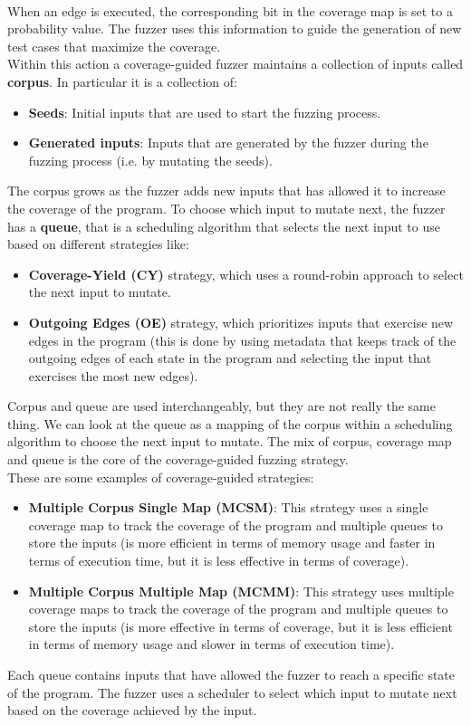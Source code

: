 \phantom{}\\
When an edge is executed, the corresponding bit in the coverage map is set to a probability value. The fuzzer uses this information to guide the generation of new test cases that maximize the coverage.
\\Within this action a coverage-guided fuzzer maintains a collection of inputs called \textbf{corpus}. In particular it is a collection of:
\begin{itemize}
    \item \textbf{Seeds}: Initial inputs that are used to start the fuzzing process.
    \item \textbf{Generated inputs}: Inputs that are generated by the fuzzer during the fuzzing process (i.e. by mutating the seeds).
\end{itemize}
The corpus grows as the fuzzer adds new inputs that has allowed it to increase the coverage of the program.
To choose which input to mutate next, the fuzzer has a \textbf{queue}, that is a scheduling algorithm that selects the next input to use based on different strategies like:
\begin{itemize}
    \item \textbf{Coverage-Yield (CY)} strategy, which uses a round-robin approach to select the next input to mutate.
    \item \textbf{Outgoing Edges (OE)} strategy, which prioritizes inputs that exercise new edges in the program (this is done by using metadata that keeps track of the outgoing edges of each state in the program and selecting the input that exercises the most new edges).
\end{itemize} 
Corpus and queue are used interchangeably, but they are not really the same thing. We can look at the queue as a mapping of the corpus within a scheduling algorithm to choose the next input to mutate.
The mix of corpus, coverage map and queue is the core of the coverage-guided fuzzing strategy.
\\These are some examples of coverage-guided strategies:
\begin{itemize}
    \item \textbf{Multiple Corpus Single Map (MCSM)}: This strategy uses a single coverage map to track the coverage of the program and multiple queues to store the inputs (is more efficient in terms of memory usage and faster in terms of execution time, but it is less effective in terms of coverage).
    
    \item \textbf{Multiple Corpus Multiple Map (MCMM)}: This strategy uses multiple coverage maps to track the coverage of the program and multiple queues to store the inputs (is more effective in terms of coverage, but it is less efficient in terms of memory usage and slower in terms of execution time).
\end{itemize}
Each queue contains inputs that have allowed the fuzzer to reach a specific state of the program. The fuzzer uses a scheduler to select which input to mutate next based on the coverage achieved by the input.


